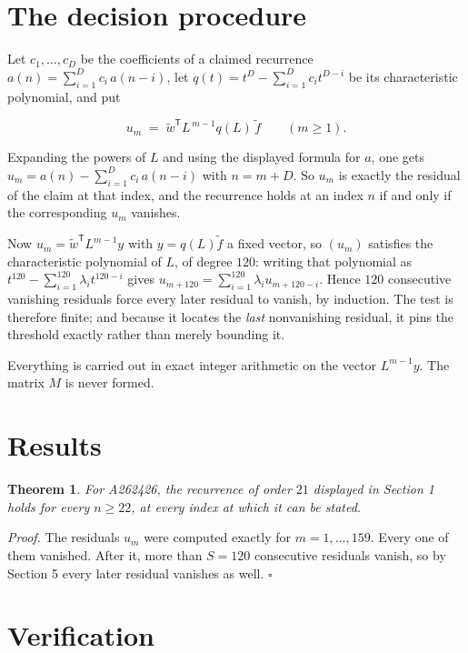 \documentclass[11pt]{article}
\newtheorem{theorem}{Theorem}
\theoremstyle{definition}
\begin{document}
\section{The decision procedure}

Let $c_1,\dots,c_D$ be the coefficients of a claimed recurrence $a(n) = \sum_{i=1}^{D} c_i\,a(n-i)$, let $q(t) = t^{D} - \sum_{i=1}^{D} c_i t^{D-i}$ be its characteristic polynomial, and put

\[u_m \;=\; \tilde w^{\mathsf T} L^{\,m-1} q(L)\,\tilde f \qquad (m \ge 1).\]

Expanding the powers of $L$ and using the displayed formula for $a$, one gets $u_m = a(n) - \sum_{i=1}^{D} c_i\,a(n-i)$ with $n = m + D$. So $u_m$ is exactly the residual of the claim at that index, and the recurrence holds at an index $n$ if and only if the corresponding $u_m$ vanishes.

Now $u_m = \tilde w^{\mathsf T} L^{m-1} y$ with $y = q(L)\tilde f$ a fixed vector, so $(u_m)$ satisfies the characteristic polynomial of $L$, of degree $120$: writing that polynomial as $t^{120} - \sum_{i=1}^{120} \lambda_i t^{120-i}$ gives $u_{m+120} = \sum_{i=1}^{120} \lambda_i u_{m+120-i}$. Hence $120$ consecutive vanishing residuals force every later residual to vanish, by induction. The test is therefore finite; and because it locates the {\itshape last} nonvanishing residual, it pins the threshold exactly rather than merely bounding it.

Everything is carried out in exact integer arithmetic on the vector $L^{m-1}y$. The matrix $M$ is never formed.

\section{Results}

\begin{theorem} For A262426, the recurrence of order $21$ displayed in Section 1 holds for every $n \ge 22$, at every index at which it can be stated.\end{theorem}

{\itshape Proof.} The residuals $u_m$ were computed exactly for $m = 1,\dots,159$. Every one of them vanished. After it, more than $S = 120$ consecutive residuals vanish, so by Section 5 every later residual vanishes as well. $\square$

\section{Verification}
\end{document}
